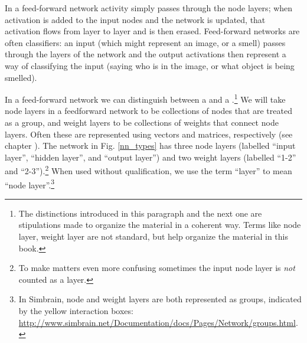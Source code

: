  In a feed-forward network activity simply passes through the node layers; when activation is added to the input nodes and the network is updated, that activation flows from layer to layer and is then erased. Feed-forward networks are often classifiers: an input (which might represent an image, or a smell) passes through the layers of the network and the output activations then represent a way of classifying the input (saying who is in the image, or what object is being smelled).

In a feed-forward network we can distinguish between a  and a .\footnote{The distinctions introduced in this paragraph and the next one are stipulations made to organize the material in a coherent way. Terms like node layer, weight layer are not standard, but help organize the material in this book.}  We will take node layers in a feedforward network to be collections of nodes that are treated as a group, and weight layers to be collections of weights that connect node layers. Often these are represented using vectors and matrices, respectively (see chapter ). The network in Fig. \ref{nn_types} has three node layers (labelled ``input layer'', ``hidden layer'', and ``output layer'') and two weight layers (labelled ``1-2'' and ``2-3'').\footnote{To make matters even more confusing sometimes the input node layer is \emph{not} counted as a layer.} When used without qualification, we use the term ``layer'' to mean ``node layer''.\footnote{In Simbrain, node and weight layers are both represented as groups, indicated by the yellow interaction boxes: \url{http://www.simbrain.net/Documentation/docs/Pages/Network/groups.html}.}

